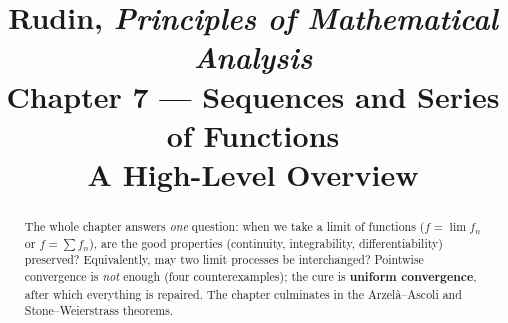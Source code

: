 \documentclass[11pt]{article}
\title{\textbf{Rudin, \emph{Principles of Mathematical Analysis}}\\[4pt]
       Chapter 7 --- Sequences and Series of Functions\\[2pt]
       \large A High-Level Overview}
\author{}
\date{}
\theoremstyle{definition}
\theoremstyle{plain}
\begin{document}
\maketitle
\vspace{-2em}

\begin{abstract}
\noindent The whole chapter answers \emph{one} question: when we take a limit of
functions ($f=\lim f_n$ or $f=\sum f_n$), are the good properties
(continuity, integrability, differentiability) preserved? Equivalently, may two
limit processes be interchanged? Pointwise convergence is \emph{not} enough
(four counterexamples); the cure is \textbf{uniform convergence}, after which
everything is repaired. The chapter culminates in the Arzel\`a--Ascoli and
Stone--Weierstrass theorems.
\end{abstract}
\end{document}
